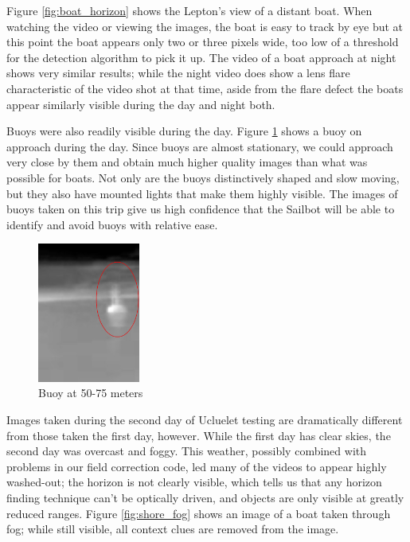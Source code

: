 Figure \ref{fig:boat_horizon} shows the Lepton's view of a distant boat. When watching the video or viewing the images, the boat is easy to track by eye but at this point the boat appears only two or three pixels wide, too low of a threshold for the detection algorithm to pick it up. The video of a boat approach at night shows very similar results; while the night video does show a lens flare characteristic of the video shot at that time, aside from the flare defect the boats appear similarly visible during the day and night both. 

Buoys were also readily visible during the day. Figure \ref{fig:buoy} shows a buoy on approach during the day. Since buoys are almost stationary, we could approach very close by them and obtain much higher quality images than what was possible for boats. Not only are the buoys distinctively shaped and slow moving, but they also have mounted lights that make them highly visible. The images of buoys taken on this trip give us high confidence that the Sailbot will be able to identify and avoid buoys with relative ease.

\begin{figure}
\centering
\includegraphics[width=0.3\textwidth]{"./image/buoy_circled"}
\caption{Buoy at 50-75 meters}
\label{fig:buoy}
\end{figure}

Images taken during the second day of Ucluelet testing are dramatically different from those taken the first day, however. While the first day has clear skies, the second day was overcast and foggy. This weather, possibly combined with problems in our field correction code, led many of the videos to appear highly washed-out; the horizon is not clearly visible, which tells us that any horizon finding technique can't be optically driven, and objects are only visible at greatly reduced ranges. Figure \ref{fig:shore_fog} shows an image of a boat taken through fog; while still visible, all context clues are removed from the image.

